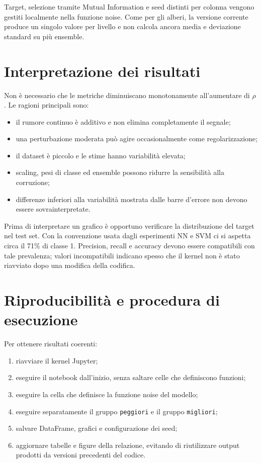 \documentclass[11pt,a4paper]{article}
\begin{document}
Target, selezione tramite Mutual Information e seed distinti per colonna vengono gestiti localmente nella funzione noise. Come per gli alberi, la versione corrente produce un singolo valore per livello e non calcola ancora media e deviazione standard su più ensemble.

\section{Interpretazione dei risultati}

Non è necessario che le metriche diminuiscano monotonamente all'aumentare di $\rho$. Le ragioni principali sono:

\begin{itemize}
    \item il rumore continuo è additivo e non elimina completamente il segnale;
    \item una perturbazione moderata può agire occasionalmente come regolarizzazione;
    \item il dataset è piccolo e le stime hanno variabilità elevata;
    \item scaling, pesi di classe ed ensemble possono ridurre la sensibilità alla corruzione;
    \item differenze inferiori alla variabilità mostrata dalle barre d'errore non devono essere sovrainterpretate.
\end{itemize}

Prima di interpretare un grafico è opportuno verificare la distribuzione del target nel test set. Con la convenzione usata dagli esperimenti NN e SVM ci si aspetta circa il 71\% di classe 1. Precision, recall e accuracy devono essere compatibili con tale prevalenza; valori incompatibili indicano spesso che il kernel non è stato riavviato dopo una modifica della codifica.

\section{Riproducibilità e procedura di esecuzione}

Per ottenere risultati coerenti:

\begin{enumerate}
    \item riavviare il kernel Jupyter;
    \item eseguire il notebook dall'inizio, senza saltare celle che definiscono funzioni;
    \item eseguire la cella che definisce la funzione noise del modello;
    \item eseguire separatamente il gruppo \texttt{peggiori} e il gruppo \texttt{migliori};
    \item salvare DataFrame, grafici e configurazione dei seed;
    \item aggiornare tabelle e figure della relazione, evitando di riutilizzare output prodotti da versioni precedenti del codice.
\end{enumerate}
\end{document}
